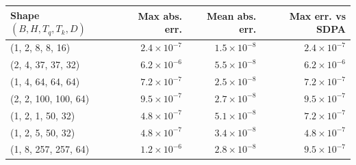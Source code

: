\begin{tabular}{lrrr}\toprule
Shape $(B,H,T_q,T_k,D)$ & Max abs. err. & Mean abs. err. & Max err. vs SDPA \\ \midrule
(1, 2, 8, 8, 16) & $2.4\times10^{-7}$ & $1.5\times10^{-8}$ & $2.4\times10^{-7}$ \\
(2, 4, 37, 37, 32) & $6.2\times10^{-6}$ & $5.5\times10^{-8}$ & $6.2\times10^{-6}$ \\
(1, 4, 64, 64, 64) & $7.2\times10^{-7}$ & $2.5\times10^{-8}$ & $7.2\times10^{-7}$ \\
(2, 2, 100, 100, 64) & $9.5\times10^{-7}$ & $2.7\times10^{-8}$ & $9.5\times10^{-7}$ \\
(1, 2, 1, 50, 32) & $4.8\times10^{-7}$ & $5.1\times10^{-8}$ & $7.2\times10^{-7}$ \\
(1, 2, 5, 50, 32) & $4.8\times10^{-7}$ & $3.4\times10^{-8}$ & $4.8\times10^{-7}$ \\
(1, 8, 257, 257, 64) & $1.2\times10^{-6}$ & $2.8\times10^{-8}$ & $9.5\times10^{-7}$ \\
\bottomrule\end{tabular}